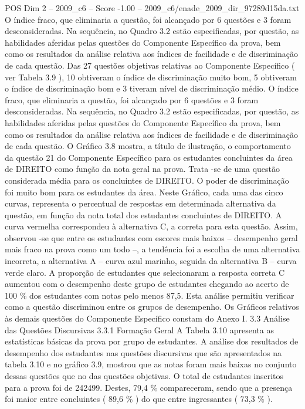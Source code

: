 \begin{textsample}{POS Dim 2 – 2009\_c6 – Score -1.00 – 2009\_c6/enade\_2009\_dir\_97289d15da.txt}
O índice fraco, que eliminaria a questão, foi alcançado por 6 questões e 3 foram desconsideradas.
Na sequência, no Quadro 3.2 estão especificadas, por questão, as habilidades aferidas pelas questões do Componente Específico da prova, bem como os resultados da análise relativa aos índices de facilidade e de discriminação de cada questão.
Das 27 questões objetivas relativas ao Componente Específico ( ver Tabela 3.9 ), 10 obtiveram o índice de discriminação muito bom, 5 obtiveram o índice de discriminação bom e 3 tiveram nível de discriminação médio.
O índice fraco, que eliminaria a questão, foi alcançado por 6 questões e 3 foram desconsideradas.
Na sequência, no Quadro 3.2 estão especificadas, por questão, as habilidades aferidas pelas questões do Componente Específico da prova, bem como os resultados da análise relativa aos índices de facilidade e de discriminação de cada questão.
O Gráfico 3.8 mostra, a título de ilustração, o comportamento da questão 21 do Componente Específico para os estudantes concluintes da área de DIREITO como função da nota geral na prova.
Trata -se de uma questão considerada média para os concluintes de DIREITO.
O poder de discriminação foi muito bom para os estudantes da área.
Neste Gráfico, cada uma das cinco curvas, representa o percentual de respostas em determinada alternativa da questão, em função da nota total dos estudantes concluintes de DIREITO.
A curva vermelha correspondeu à alternativa C, a correta para esta questão.
Assim, observou -se que entre os estudantes com escores mais baixos – desempenho geral mais fraco na prova como um todo –, a tendência foi a escolha de uma alternativa incorreta, a alternativa A – curva azul marinho, seguida da alternativa B – curva verde claro.
A proporção de estudantes que selecionaram a resposta correta C aumentou com o desempenho deste grupo de estudantes chegando ao acerto de 100 \% dos estudantes com notas pelo menos 87,5.
Esta análise permitiu verificar como a questão discriminou entre os grupos de desempenho.
Os Gráficos relativos às demais questões do Componente Específico constam do Anexo I. 3.3 Análise das Questões Discursivas 3.3.1 Formação Geral A Tabela 3.10 apresenta as estatísticas básicas da prova por grupo de estudantes.
A análise dos resultados de desempenho dos estudantes nas questões discursivas que são apresentados na tabela 3.10 e no gráfico 3.9, mostrou que as notas foram mais baixas no conjunto dessas questões que no das questões objetivas.
O total de estudantes inscritos para a prova foi de 242499.
Destes, 79,4 \% compareceram, sendo que a presença foi maior entre concluintes ( 89,6 \% ) do que entre ingressantes ( 73,3 \% ).

\end{textsample}
